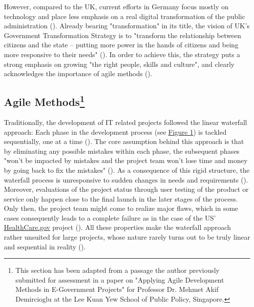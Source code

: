 However, compared to the UK, current efforts in Germany focus mostly on technology and place less emphasis on a real digital transformation of the public administration (\cite{Mergel2019, EuropeanCommission2019b}). Already bearing "transformation" in its title, the vision of UK's Government Transformation Strategy is to "transform the relationship between citizens and the state – putting more power in the hands of citizens and being more responsive to their needs" (\cite{CabinetOffice2017}). In order to achieve this, the strategy puts a strong emphasis on growing "the right people, skills and culture", and clearly acknowledges the importance of agile methods (\cite{CabinetOffice2017}).\par 


\subsection[Agile Methods]{Agile Methods\footnote{This section has been adapted from a passage the author previously submitted for assessment in a paper on "Applying Agile Development Methods in E-Government Projects" for Professor Dr. Mehmet Akif Demircioglu at the Lee Kuan Yew School of Public Policy, Singapore.}}\label{Agile Methods}
\begin{wrapfigure}[8]{r}{0.5\textwidth}
	\centering
	\texttt{[image: \{"Latex/THESIS/Figures/Waterfall"]}.pdf}
	\caption[Waterfall development process]{Waterfall development process (adapted from \cite{Mergel2016})}
	\label{fig:Waterfall development}
\end{wrapfigure}
Traditionally, the development of IT related projects followed the linear waterfall approach: Each phase in the development process (see \hyperref[fig:Waterfall development]{Figure 1}) is tackled sequentially, one at a time (\cite{Kannan2014, Sherrell2013}). The core assumption behind this approach is that by eliminating any possible mistakes within each phase, the subsequent phases "won't be impacted by mistakes and the project team won't lose time and money by going back to fix the mistakes" (\cite[p. 517]{Mergel2016}). As a consequence of this rigid structure, the waterfall process is unresponsive to sudden changes in needs and requirements (\cite{Kannan2014}). Moreover, evaluations of the project status through user testing of the product or service only happen close to the final launch in the later stages of the process. Only then, the project team might come to realize major flaws, which in some cases consequently leads to a complete failure as in the case of the US' \href{www.healthcare.gov}{HealthCare.gov} project (\cite{Mergel2016}). All these properties make the waterfall approach rather unsuited for large projects, whose nature rarely turns out to be truly linear and sequential in reality (\cite{Kannan2014}).

